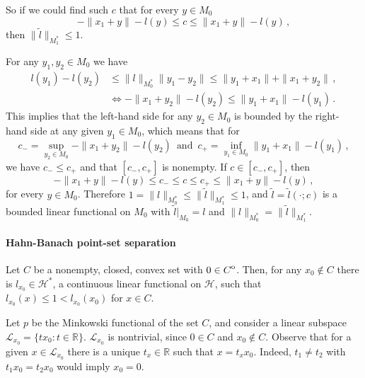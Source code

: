 \documentclass[a4paper]{article}
\newcommand{\Hcal}{\mathcal{H}}
\newcommand{\real}{\mathbb{R}}
\newcommand{\interior}[1]{%
  {\kern0pt#1}^{\mathrm{o}}%
}
\newcommand{\Lcal}{\mathcal{L}}
\begin{document}
So if we could find such $c$ that for every $y \in M_0$
\begin{equation*}
  - \|x_1 + y\| - l(y) \leq c \leq \|x_1 + y\| - l(y)
    \,,
\end{equation*}
then $\|\tilde{l}\|_{M_1^*} \leq 1$.

For any $y_1, y_2 \in M_0$ we have
\begin{align*}
  l(y_1) - l(y_2)
    &\leq \|l\|_{M_0^*} \|y_1 - y_2\|
    \leq \|y_1 + x_1 \| + \|x_1 + y_2\|
    \,, \\
  &\Leftrightarrow
  - \|x_1 + y_2\| - l(y_2)
    \leq \|y_1 + x_1 \| - l(y_1)
    \,.
\end{align*}
This implies that the left-hand side for any $y_2\in M_0$ is bounded by the right-%
hand side at any given $y_1\in M_0$, which means that for
\begin{equation*}
  c_-
    = \sup_{y_2\in M_0} - \|x_1 + y_2\| - l(y_2)
    \,\text{ and }\,
    c_+ = \inf_{y_1\in M_0} \|y_1 + x_1 \| - l(y_1)
    \,,
\end{equation*}
we have $c_- \leq c_+$ and that $[c_-, c_+]$ is nonempty. If $c\in [c_-, c_+]$, then
\begin{equation*}
  - \|x_1 + y\| - l(y) \leq c_- \leq c \leq c_+ \leq \|x_1 + y\| - l(y)
    \,,
\end{equation*}
for every $y \in M_0$. Therefore $1 = \|l\|_{M_0^*} \leq \|\tilde{l}\|_{M_1^*} \leq 1$, 
and $\tilde{l} = \tilde{l}(\cdot; c)$ is a bounded linear functional on $M_0$ with
$\tilde{l}\big\vert_{M_0} = l$ and $\|l\|_{M_0^*}=\|\tilde{l}\|_{M_1^*}$.


\paragraph{Hahn-Banach point-set separation} %
\label{par:hahn_banach_point_set_separation}

Let $C$ be a nonempty, closed, convex set with $0\in \interior{C}$. Then, for any
$x_0\notin C$ there is $l_{x_0} \in \Hcal^*$, a continuous linear functional on
$\Hcal$, such that $l_{x_0}(x) \leq 1 < l_{x_0}(x_0)$ for $x\in C$.

Let $p$ be the Minkowski functional of the set $C$, and consider a linear subspace
$\Lcal_{x_0} = \{t x_0\colon t\in \real\}$. $\Lcal_{x_0}$ is nontrivial, since $0\in C$
and $x_0\notin C$. Observe that for a given $x\in \Lcal_{x_0}$ there is a unique
$t_x \in \real$ such that $x = t_x x_0$. Indeed, $t_1\neq t_2$ with $t_1 x_0 = t_2 x_0$
would imply $x_0 = 0$.
\end{document}
